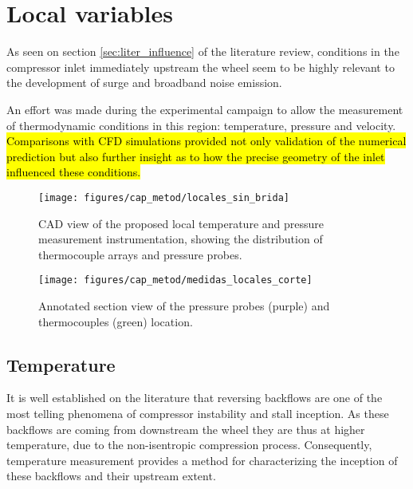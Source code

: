 \section{Local variables}

As seen on section \ref{sec:liter_influence} of the literature review, conditions in the compressor inlet immediately upstream the wheel seem to be highly relevant to the development of surge and broadband noise emission. 

An effort was made during the experimental campaign to allow the measurement of thermodynamic conditions in this region: temperature, pressure and velocity. \hl{Comparisons with CFD simulations provided not only validation of the numerical prediction but also further insight as to how the precise geometry of the inlet influenced these conditions.}

\begin{figure}[htb!]
\centering
\texttt{[image: figures/cap\_metod/locales\_sin\_brida]}
\caption{CAD view of the proposed local temperature and pressure measurement instrumentation, showing the distribution of thermocouple arrays and pressure probes.}
\label{fig:metod_local_meas}
\end{figure}


\begin{figure}[b!]
\centering
\texttt{[image: figures/cap\_metod/medidas\_locales\_corte]}
\caption{Annotated section view of the pressure probes (purple) and thermocouples (green) location.}
\label{fig:metod_local_meas_dimen}
\end{figure}

\subsection{Temperature}

It is well established on the literature that reversing backflows are one of the most telling phenomena of compressor instability and stall inception. As these backflows are coming from downstream the wheel they are thus at higher temperature, due to the non-isentropic compression process. Consequently, temperature measurement provides a method for characterizing the inception of these backflows and their upstream extent.

